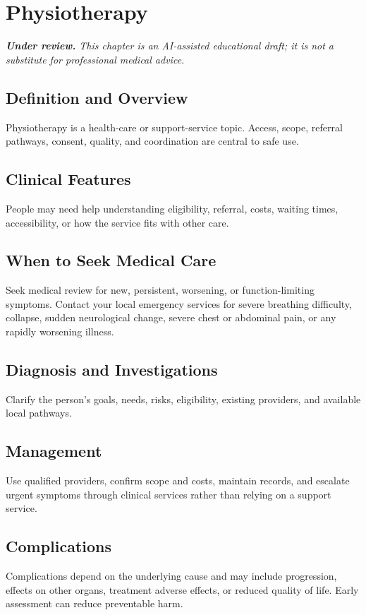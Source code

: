 \chapter{Physiotherapy}

\medskip
\noindent\textit{\textbf{Under review.} This chapter is an AI-assisted educational draft; it is not a substitute for professional medical advice.}

\section*{Definition and Overview}
Physiotherapy is a health-care or support-service topic. Access, scope, referral pathways, consent, quality, and coordination are central to safe use.

\section*{Clinical Features}
People may need help understanding eligibility, referral, costs, waiting times, accessibility, or how the service fits with other care.

\section*{When to Seek Medical Care}
Seek medical review for new, persistent, worsening, or function-limiting symptoms. Contact your local emergency services for severe breathing difficulty, collapse, sudden neurological change, severe chest or abdominal pain, or any rapidly worsening illness.

\section*{Diagnosis and Investigations}
Clarify the person's goals, needs, risks, eligibility, existing providers, and available local pathways.

\section*{Management}
Use qualified providers, confirm scope and costs, maintain records, and escalate urgent symptoms through clinical services rather than relying on a support service.

\section*{Complications}
Complications depend on the underlying cause and may include progression, effects on other organs, treatment adverse effects, or reduced quality of life. Early assessment can reduce preventable harm.

